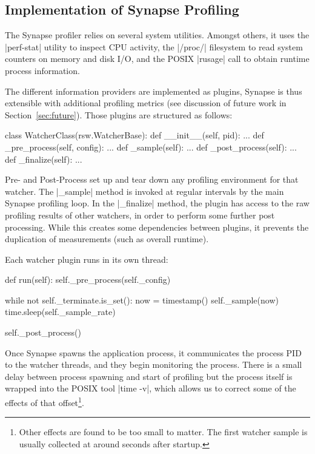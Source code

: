 \documentclass[10pt, conference, compsocconf]{IEEEtran}
\newcommand{\synapse}{Synapse\xspace}
\newcommand{\Synapse}{Synapse\xspace}
\begin{document}
 
 \subsection{Implementation of \Synapse Profiling}
 
 The \synapse profiler relies on several system utilities.  Amongst
 others, it uses the |perf-stat| utility to inspect CPU activity, the
 |/proc/| filesystem to read system counters on memory and disk I/O,
 and the POSIX |rusage| call to obtain runtime process information.

 The different information providers are implemented as plugins,
 \synapse is thus extensible with additional profiling metrics (see
 discussion of future work in Section~\ref{sec:future}). Those
 plugins are structured as follows:

 \begin{myio}
 class WatcherClass(rsw.WatcherBase):
     def __init__(self, pid):
         ...
     def _pre_process(self, config): 
         ...
     def _sample(self): 
         ...
     def _post_process(self): 
         ...
     def _finalize(self): 
         ...
 \end{myio}

 Pre- and Post-Process set up and tear down any profiling environment
 for that watcher.  The |_sample| method is invoked at regular
 intervals by the main \synapse profiling loop.  In the |_finalize|
 method, the plugin has access to the raw profiling results of other
 watchers, in order to perform some further post processing.  While this
 creates some dependencies between plugins, it prevents the
 duplication of measurements (such as overall runtime).

 Each watcher plugin runs in its own thread:

 \begin{myio}
 def run(self):
     self._pre_process(self._config)

     while not self._terminate.is_set():
         now = timestamp()
         self._sample(now)
         time.sleep(self._sample_rate)

     self._post_process()
 \end{myio}

 Once \synapse spawns the application process, it communicates the
 process PID to the watcher threads, and they begin monitoring the
 process.  There is a small delay between process spawning and start
 of profiling but the process itself is wrapped into the POSIX tool
 |time -v|, which allows us to correct some of the effects of that
 offset\footnote{Other effects are found to be too small to matter.
 The first watcher sample is usually collected at around 
 seconds after startup.}.
\end{document}
